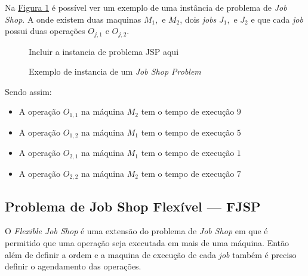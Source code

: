             Na 
            \hyperref[fig:ex-instancia-problema-JSP]{Figura \ref{fig:ex-instancia-problema-JSP}}
            é possível ver um exemplo de uma instância de problema de \textit{Job Shop}. 
            A onde existem duas maquinas $M_1, $ e $M_2$, 
            dois \textit{jobs} $J_1, $ e $J_2$ 
            e que cada \textit{job} possui 
            duas operações $O_{j,1} $ e $O_{j,2}$.\hfill\vspace{\onelineskip}

            \begin{figure}[ht]
                \centering
                \small{Incluir a instancia de problema JSP aqui}
                \caption{Exemplo de instancia de um \textit{Job Shop Problem}}
                \label{fig:ex-instancia-problema-JSP}
            \end{figure}
            
            \noindent Sendo assim:\hfill
            \begin{itemize}
                \item A operação $O_{1,1}$ na máquina $M_2$ tem o tempo de execução $9$
                \item A operação $O_{1,2}$ na máquina $M_1$ tem o tempo de execução $5$
                \item A operação $O_{2,1}$ na máquina $M_1$ tem o tempo de execução $1$
                \item A operação $O_{2,2}$ na máquina $M_2$ tem o tempo de execução $7$
            \end{itemize}\hfill\vspace{\onelineskip}
            



    \subsection{Problema de Job Shop Flexível — FJSP}
            O \textit{Flexible Job Shop} é uma extensão do problema de \textit{Job Shop} em que é permitido que uma operação seja executada em mais de uma máquina. Então além de definir a ordem e a maquina de execução de cada \textit{job} também é preciso definir o agendamento das operações.\hfill\vspace{\onelineskip}
            

